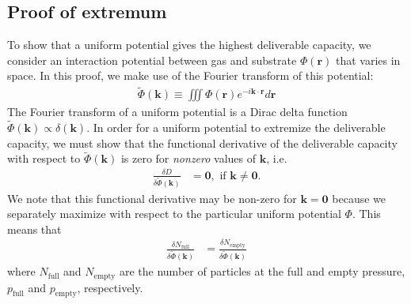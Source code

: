 \documentclass[twoside,twocolumn,9pt]{article}
\newcommand{\rvec}{\mathbf{r}}
\newcommand{\kvec}{\mathbf{k}}
\newcommand\V{\Phi}
\newcommand\Vk{\tilde\Phi(\kvec)}
\newcommand\pfull{\ensuremath{p_{\text{full}}}}
\newcommand\pempty{\ensuremath{p_{\text{empty}}}}
\begin{document}
\subsection{Proof of extremum}\label{sec:proof-extremum}
To show that a uniform potential gives the highest deliverable capacity, we
consider an interaction potential between gas and substrate $\V(\rvec)$ that
varies in space.  In this proof, we make use of the Fourier transform of
this potential:
\begin{align}
    \Vk \equiv \iiint \V(\rvec) e^{-i\kvec\cdot \rvec} d\rvec
\end{align}
The Fourier transform of a uniform potential is a Dirac delta function $\tilde{\V}(\kvec)\propto\delta(\kvec)$. In order for a uniform potential
to extremize the deliverable capacity, we must show that the functional
derivative of the deliverable capacity with respect to $\Vk$ is zero for
\emph{nonzero} values of $\kvec$, i.e.
\begin{align}
    \frac{\delta D}{\delta \Vk} &= \mathbf{0}, \text{ if } \kvec\ne \mathbf{0}.
\end{align}
We note that this functional derivative may be non-zero for $\kvec=\mathbf{0}$
because we separately maximize with respect to the particular uniform potential
$\V$. This means that
\begin{align}
    \frac{\delta N_\text{full}}{\delta \Vk} &= \frac{\delta N_\text{empty}}{\delta \Vk}
\end{align}
where $N_\text{full}$ and $N_\text{empty}$ are the number of particles at the full and empty pressure, $\pfull$ and $\pempty$, respectively.
\end{document}
